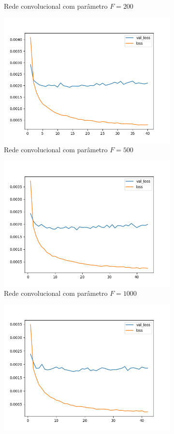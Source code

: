 \begin{figure}[p]
\begin{subfigure}{.5\textwidth}
  \caption{Rede convolucional com parâmetro $F = 200$}
  \label{fig:cnn-200-k-2}
\end{subfigure}
\begin{subfigure}{.5\textwidth}
  \centering
  \includegraphics[width=.8\linewidth]{figuras/ape-ajustes-hiper-parametros/cnn-500-k-2.png}
  \caption{Rede convolucional com parâmetro $F = 500$}
  \label{fig:cnn-500-k-2}
\end{subfigure}
\begin{subfigure}{.5\textwidth}
  \centering
  \includegraphics[width=.8\linewidth]{figuras/ape-ajustes-hiper-parametros/cnn-1000-k-2.png}
  \caption{Rede convolucional com parâmetro $F = 1000$}
  \label{fig:cnn-1000-k-2}
\end{subfigure}
\begin{subfigure}{.5\textwidth}
  \centering
  \includegraphics[width=.8\linewidth]{figuras/ape-ajustes-hiper-parametros/cnn-2000-k-2.png}

\end{subfigure}
\end{figure}
